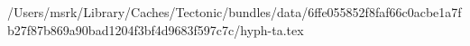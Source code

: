 /Users/msrk/Library/Caches/Tectonic/bundles/data/6ffe055852f8faf66c0acbe1a7fb27f87b869a90bad1204f3bf4d9683f597c7c/hyph-ta.tex